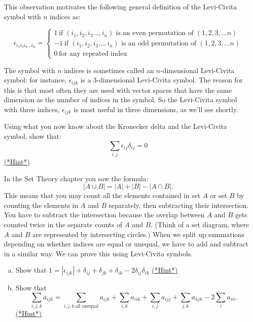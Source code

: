 This observation motivates the following general definition  of the {\bfi Levi-Civita symbol} with $n$ indices as:

\[ \epsilon_{i_1 i_2 i_3…i_n}=
\begin{cases}
1 ~ \text{if $(i_1,i_2,i_3…,i_n)$ is an even permutation of $(1,2,3, \ldots n)$}\\
-1 ~ \text{if $(i_1,i_2,i_3…,i_n)$ is an odd permutation of $(1,2,3, \ldots n)$}\\
0 ~ \text{for any repeated index}
\end{cases} \]

The symbol with $n$ indices is sometimes called an $n$-dimensional Levi-Civita symbol: for instance, $\epsilon_{ijk}$ is a 3-dimensional Levi-Civita symbol.  The reason for this is that most often they are used with vector spaces that have the same dimension as the number of indices in the symbol.  So   the Levi-Civita symbol with three indices, $\epsilon_{ijk}$ is most useful in three dimensions, as we'll see shortly.

\begin{exercise}\label{exercise:Sigma:KLC}
Using what you now know about the Kronecker delta and the Levi-Civita symbol, show that:
\[
\sum_{i,j} \epsilon_{ij} \delta_{ij}=0
\]
\hyperref[sec:sigma:hints]{(*Hint*)} 
\end{exercise}

In the Set Theory chapter you saw the formula:
\[ |A \cup B| = |A| + |B| - |A \cap B|.\]
This means that you may count all the elements contained in set $A$ or set $B$ by counting the elements in $A$ and $B$ separately, then subtracting their intersection.  You have to  subtract the intersection because  the overlap between $A$ and $B$ gets counted twice in the separate counts of $A$ and $B$.  (Think of a set diagram, where $A$ and $B$ are represented by intersecting circles.)  When we split up summations depending on whether indices are equal or unequal, we have to add and subtract in a similar way. We can prove this using Levi-Civita symbols.
  
\begin{exercise}\label{exercise:Sigma:split}
\begin{enumerate}[(a)]
\item
Show that $1=|\epsilon_{ijk}|+\delta_{ij}+\delta_{jk}+\delta_{ik}-2\delta_{ij}\delta_{ik}$ 
\hyperref[sec:sigma:hints]{(*Hint*)} 
\item
Show that 
\[
\sum_{i,j,k} a_{ijk}=\sum_{i,j,k~\text{all unequal}}a_{ijk}+\sum_{i,k}a_{iik}+\sum_{i,j}a_{ijj}+\sum_{j,k}a_{kjk}-2\sum_{i}a_{iii}.
\]
\hyperref[sec:sigma:hints]{(*Hint*)} 
\end{enumerate}
\end{exercise}


